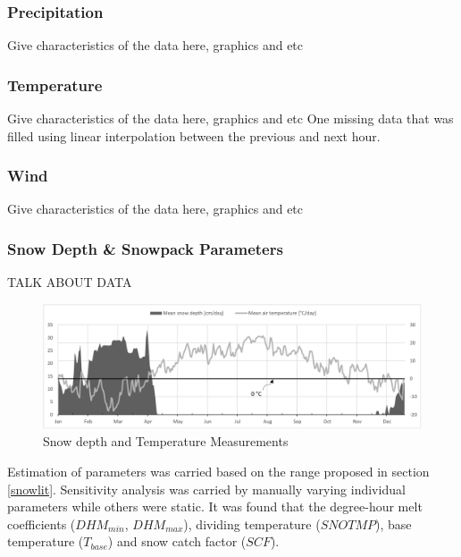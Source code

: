 \subsubsection{Precipitation}
Give characteristics of the data here, graphics and etc


\subsubsection{Temperature}
Give characteristics of the data here, graphics and etc
One missing data that was filled using linear interpolation between the previous and next hour.


\subsubsection{Wind}
Give characteristics of the data here, graphics and etc



\subsubsection{Snow Depth \& Snowpack Parameters}


TALK ABOUT DATA

\begin{figure}[h]
    \centering
	\includegraphics[scale=0.45]{figures/measuredsnowpack.png}
	\caption{Snow depth and Temperature Measurements \citet{fmidata}}
	\label{fig:snowmeasurement}
\end{figure}
        
Estimation of parameters was carried based on the range proposed in section \ref{snowlit}. Sensitivity analysis was carried by manually varying individual parameters while others were static. It was found that the degree-hour melt coefficients ($DHM_{min}$, $DHM_{max}$), dividing temperature ($SNOTMP$), base temperature ($T_{base}$) and snow catch factor ($SCF$).

